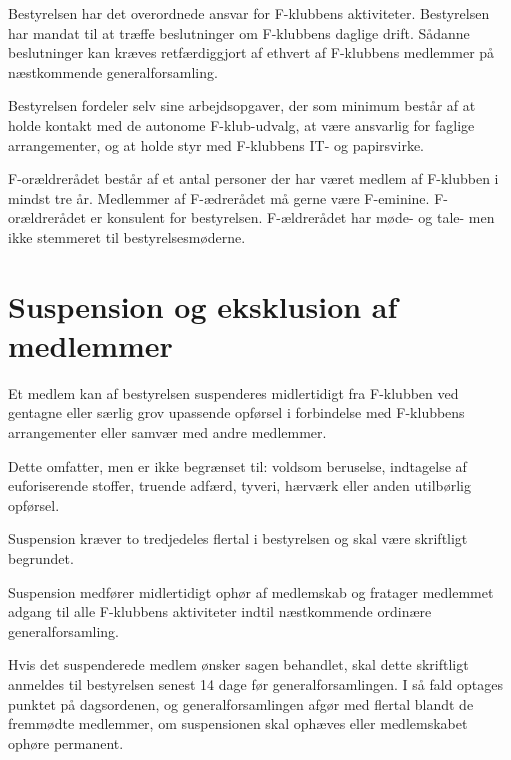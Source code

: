 \documentclass[a4paper,12pt,danish]{article}
\begin{document}
\begin{list}
\item Bestyrelsen har det overordnede ansvar for F-klubbens
  aktiviteter. Bestyrelsen har mandat til at træffe beslutninger om
  F-klubbens daglige drift. Sådanne beslutninger kan kræves
  retfærdiggjort af ethvert af F-klubbens medlemmer på næstkommende
  generalforsamling.

  
\item Bestyrelsen fordeler selv sine arbejdsopgaver, der som minimum
  består af at holde kontakt med de autonome F-klub-udvalg, at
  være ansvarlig for faglige arrangementer, og at holde styr med
  F-klubbens IT- og papirsvirke.


\item F-orældrerådet består af et antal
  personer der har været medlem af F-klubben i mindst tre år.
  Medlemmer af F-ædrerådet må gerne være F-eminine.
  F-orældrerådet er konsulent for bestyrelsen. F-ældrerådet
  har møde- og tale- men ikke stemmeret til bestyrelsesmøderne.

\section{Suspension og eksklusion af medlemmer}

\item Et medlem kan af bestyrelsen suspenderes midlertidigt fra
F-klubben ved gentagne eller særlig grov upassende opførsel i forbindelse
med F-klubbens arrangementer eller samvær med andre medlemmer.

Dette omfatter, men er ikke begrænset til: voldsom beruselse, indtagelse
af euforiserende stoffer, truende adfærd, tyveri, hærværk eller anden
utilbørlig opførsel.

Suspension kræver to tredjedeles flertal i bestyrelsen og skal være
skriftligt begrundet.

Suspension medfører midlertidigt ophør af medlemskab og fratager medlemmet
adgang til alle F-klubbens aktiviteter indtil næstkommende ordinære
generalforsamling.

Hvis det suspenderede medlem ønsker sagen behandlet, skal dette skriftligt
anmeldes til bestyrelsen senest 14 dage før generalforsamlingen.
I så fald optages punktet på dagsordenen, og generalforsamlingen afgør med
flertal blandt de fremmødte medlemmer, om suspensionen skal
ophæves eller medlemskabet ophøre permanent.


\end{list}
\end{document}
